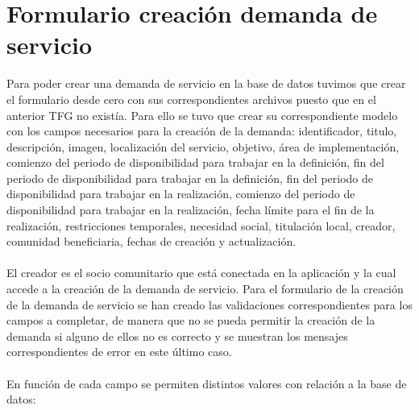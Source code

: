 \documentclass[11pt]{book}
\begin{document}
\section{Formulario creación demanda de servicio}
Para poder crear una demanda de servicio en la base de datos tuvimos que crear el formulario desde cero con sus correspondientes archivos puesto que en el anterior TFG no existía. Para ello se tuvo que crear su correspondiente modelo con los campos necesarios para la creación de la demanda: identificador, titulo, descripción, imagen, localización del servicio, objetivo, área de implementación, comienzo del periodo de disponibilidad para trabajar en la definición, fin del periodo de disponibilidad para trabajar en la definición, fin del periodo de disponibilidad para trabajar en la realización, comienzo del periodo de disponibilidad para trabajar en la realización, fecha límite para el fin de la realización, restricciones temporales, necesidad social, titulación local, creador, comunidad beneficiaria, fechas de creación y actualización.\\\\
El creador es el socio comunitario que está conectada en la aplicación y la cual accede a la creación de la demanda de servicio.
Para el formulario de la creación de la demanda de servicio se han creado las validaciones correspondientes para los campos a completar, de manera que no se pueda permitir la creación de la demanda si alguno de ellos no es correcto y se muestran los mensajes correspondientes de error en este último caso.\\\\
En función de cada campo se permiten distintos valores con relación a la base de datos: \\
\end{document}
